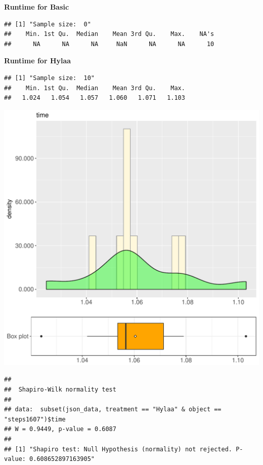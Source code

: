 \documentclass{article}\usepackage[]{graphicx}\usepackage[]{color}
\makeatletter
\def\maxwidth{ %
  \ifdim\Gin@nat@width>\linewidth
    \linewidth
  \else
    \Gin@nat@width
  \fi
}
\newenvironment{kframe}{%
 \def\at@end@of@kframe{}%
 \ifinner\ifhmode%
  \def\at@end@of@kframe{\end{minipage}}%
  \begin{minipage}{\columnwidth}%
 \fi\fi%
 \def\FrameCommand##1{\hskip\@totalleftmargin \hskip-\fboxsep
 \colorbox{shadecolor}{##1}\hskip-\fboxsep
     \hskip-\linewidth \hskip-\@totalleftmargin \hskip\columnwidth}%
 \MakeFramed {\advance\hsize-\width
   \@totalleftmargin\z@ \linewidth\hsize
   \@setminipage}}%
 {\par\unskip\endMakeFramed%
 \at@end@of@kframe}
\newenvironment{knitrout}{}{} %
\makeatother
\begin{document}
 \textbf{Runtime for Basic}
\begin{knitrout}
\color{fgcolor}\begin{kframe}
\begin{verbatim}
## [1] "Sample size:  0"
##    Min. 1st Qu.  Median    Mean 3rd Qu.    Max.    NA's 
##      NA      NA      NA     NaN      NA      NA      10
\end{verbatim}
\end{kframe}
\end{knitrout}
 \textbf{Runtime for Hylaa}
\begin{knitrout}
\color{fgcolor}\begin{kframe}
\begin{verbatim}
## [1] "Sample size:  10"
##    Min. 1st Qu.  Median    Mean 3rd Qu.    Max. 
##   1.024   1.054   1.057   1.060   1.071   1.103
\end{verbatim}
\end{kframe}
\includegraphics[width=\maxwidth]{figure/RH3_Hylaa_steps1607-1} 
\begin{kframe}\begin{verbatim}
## 
## 	Shapiro-Wilk normality test
## 
## data:  subset(json_data, treatment == "Hylaa" & object == "steps1607")$time
## W = 0.9449, p-value = 0.6087
## 
## [1] "Shapiro test: Null Hypothesis (normality) not rejected. P-value: 0.608652897163905"
\end{verbatim}
\end{kframe}
\end{knitrout}
  
\end{document}

